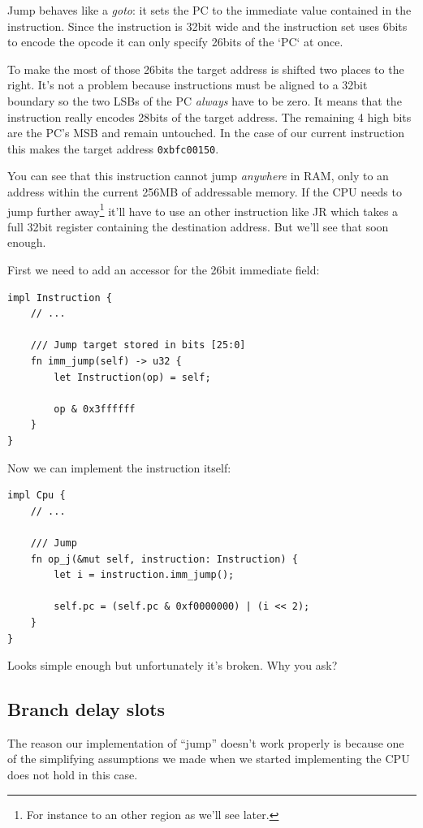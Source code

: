 \documentclass[a4paper]{article}
\newcommand{\code}[1] {\texttt{#1}}
\begin{document}
Jump behaves like a \emph{goto}: it sets the PC to the immediate value
contained in the instruction. Since the instruction is 32bit wide and
the instruction set uses 6bits to encode the opcode it can only
specify 26bits of the `PC` at once.

To make the most of those 26bits the target address is shifted two
places to the right. It's not a problem because instructions must be
aligned to a 32bit boundary so the two LSBs of the PC \emph{always}
have to be zero. It means that the instruction really encodes 28bits
of the target address. The remaining 4 high bits are the PC's MSB and
remain untouched. In the case of our current instruction this makes
the target address \code{0xbfc00150}.

You can see that this instruction cannot jump \emph{anywhere} in RAM,
only to an address within the current 256MB of addressable memory. If
the CPU needs to jump further away\footnote{For instance to an other
  region as we'll see later.} it'll have to use an other instruction
like JR which takes a full 32bit register containing the destination
address. But we'll see that soon enough.

First we need to add an accessor for the 26bit immediate field:

\begin{lstlisting}
impl Instruction {
    // ...

    /// Jump target stored in bits [25:0]
    fn imm_jump(self) -> u32 {
        let Instruction(op) = self;

        op & 0x3ffffff
    }
}
\end{lstlisting}

Now we can implement the instruction itself:

\begin{lstlisting}
impl Cpu {
    // ...

    /// Jump
    fn op_j(&mut self, instruction: Instruction) {
        let i = instruction.imm_jump();

        self.pc = (self.pc & 0xf0000000) | (i << 2);
    }
}
\end{lstlisting}

Looks simple enough but unfortunately it's broken. Why you ask?

\subsection{Branch delay slots}
\label{sec:bds}

The reason our implementation of ``jump'' doesn't work properly is
because one of the simplifying assumptions we made when we started
implementing the CPU does not hold in this case.
\end{document}
